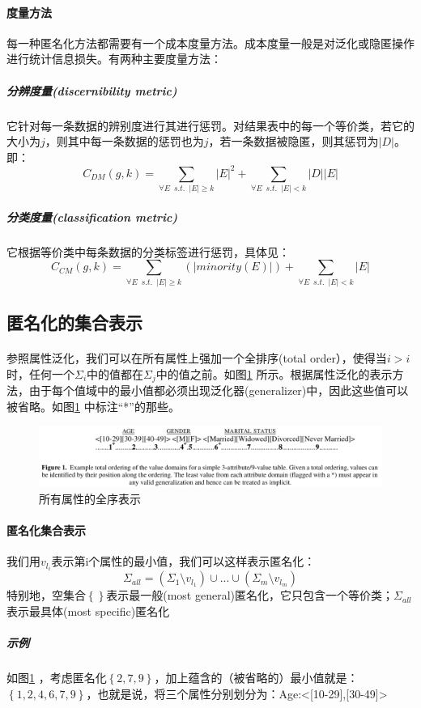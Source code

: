 \documentclass[12pt,a4paper]{article}
\begin{document}
\paragraph{度量方法} 每一种匿名化方法都需要有一个成本度量方法。成本度量一般是对泛化或隐匿操作进行统计信息损失。有两种主要度量方法：
	\subparagraph{分辨度量(discernibility metric)} 它针对每一条数据的辨别度进行其进行惩罚。对结果表中的每一个等价类，若它的大小为$j$，则其中每一条数据的惩罚也为$j$，若一条数据被隐匿，则其惩罚为$|D|$。即：
	\begin{equation}
		C_{DM}(g,k)= \sum_{\forall E \enspace s.t. \enspace |E|\geq k} |E|^2 + \sum_{\forall E \enspace s.t.\enspace |E| < k} |D||E|
	\end{equation}
	\subparagraph{分类度量(classification metric)} 它根据等价类中每条数据的分类标签进行惩罚，具体见\cite{iyengar2002}：
	\begin{equation}
		C_{CM}(g,k)=\sum_{\forall E \enspace s.t. \enspace |E|\geq k} (|minority(E)|) + \sum_{\forall E \enspace s.t.\enspace |E| < k} |E|
	\end{equation}

\subsection{匿名化的集合表示}
\paragraph{} 参照属性泛化，我们可以在所有属性上强加一个全排序(total order），使得当$i > i$时，任何一个$\Sigma_i$中的值都在$\Sigma_j$中的值之前。如图\ref{total-order-attributes} 所示。根据属性泛化的表示方法，由于每个值域中的最小值都必须出现泛化器(generalizer)中，因此这些值可以被省略。如图\ref{total-order-attributes} 中标注“*”的那些。
\begin{figure}[H]
	\centering
	\includegraphics[width=1\textwidth]{../images/total-order-attributes.png}
	\caption{所有属性的全序表示}
	\label{total-order-attributes}
\end{figure}
\paragraph{匿名化集合表示} 我们用$v_{l_i}$表示第i个属性的最小值，我们可以这样表示匿名化：
\begin{equation}
	\Sigma_{all} = (\Sigma_1 \setminus v_{l_1})\cup ... \cup (\Sigma_m \setminus v_{l_m})
\end{equation}
特别地，空集合$\left \{ \right \}$表示最一般(most general)匿名化，它只包含一个等价类；$\Sigma_{all}$表示最具体(most specific)匿名化
	\subparagraph{示例} 如图\ref{total-order-attributes} ，考虑匿名化$\left \{ 2,7,9 \right \}$，加上蕴含的（被省略的）最小值就是：$\left \{ 1,2,4,6,7,9 \right \}$，也就是说，将三个属性分别划分为：Age:<[10-29],[30-49]>
\end{document}

